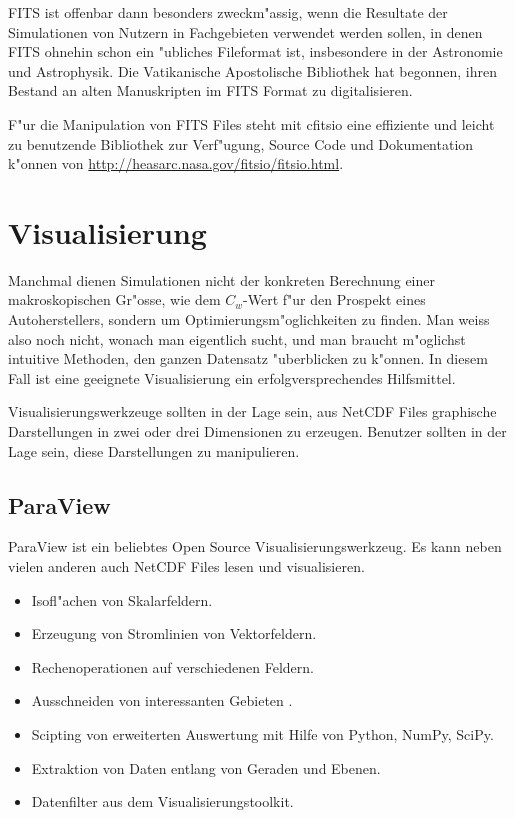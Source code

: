 FITS ist offenbar dann besonders zweckm"assig, wenn die Resultate
der Simulationen von Nutzern in Fachgebieten verwendet werden sollen,
in denen FITS ohnehin schon ein "ubliches Fileformat ist, insbesondere
in der Astronomie und Astrophysik.
Die Vatikanische Apostolische Bibliothek hat begonnen, ihren Bestand
an alten Manuskripten im FITS Format zu digitalisieren.

F"ur die Manipulation von FITS Files steht mit cfitsio eine effiziente
und leicht zu benutzende Bibliothek zur Verf"ugung, Source Code und
Dokumentation k"onnen von \url{http://heasarc.nasa.gov/fitsio/fitsio.html}.

\section{Visualisierung}
Manchmal dienen Simulationen nicht der konkreten Berechnung einer
makroskopischen Gr"osse, wie dem $C_w$-Wert f"ur den Prospekt eines
Autoherstellers, sondern um Optimierungsm"oglichkeiten zu finden.
Man weiss also noch nicht, wonach man eigentlich sucht, und man
braucht m"oglichst intuitive Methoden, den ganzen Datensatz
"uberblicken zu k"onnen.
In diesem Fall ist eine geeignete Visualisierung ein erfolgversprechendes
Hilfsmittel.

Visualisierungswerkzeuge sollten in der Lage sein, aus NetCDF Files
graphische Darstellungen in zwei oder drei Dimensionen zu erzeugen.
Benutzer sollten in der Lage sein, diese Darstellungen zu manipulieren.

\subsection{ParaView}
ParaView ist ein beliebtes Open Source Visualisierungswerkzeug.
Es kann neben vielen anderen auch NetCDF Files lesen und visualisieren.
\begin{itemize}
\item Isofl"achen von Skalarfeldern.
\item Erzeugung von Stromlinien von Vektorfeldern.
\item Rechenoperationen auf verschiedenen Feldern.
\item Ausschneiden von interessanten Gebieten .
\item Scipting von erweiterten Auswertung mit Hilfe von Python, NumPy, SciPy.
\item Extraktion von Daten entlang von Geraden und Ebenen.
\item Datenfilter aus dem Visualisierungstoolkit.
\end{itemize}

